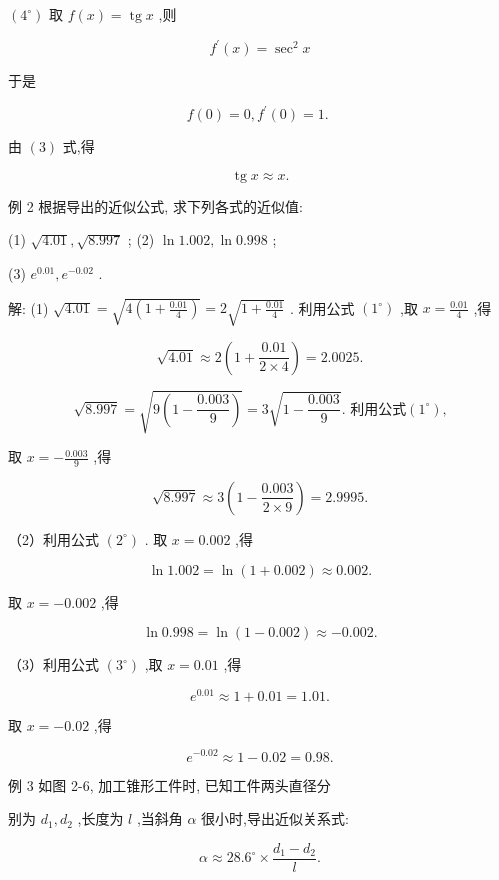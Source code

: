 \documentclass[lang=cn,newtx,10pt,scheme=chinese]{elegantbook}
\begin{document}
\(\left( {4}^{ \circ }\right)\) 取 \(f\left( x\right) = \operatorname{tg}x\) ,则

\[
{f}^{\prime }\left( x\right) = {\sec }^{2}x
\]

于是

\[
f\left( 0\right) = 0,{f}^{\prime }\left( 0\right) = 1\text{. }
\]

由 \(\left( 3\right)\) 式,得

\[
\operatorname{tg}x \approx x\text{.}
\]

例 2 根据导出的近似公式, 求下列各式的近似值:

(1) \(\sqrt{4.01},\sqrt{8.997}\) ; (2) \(\ln {1.002},\ln {0.998}\) ;

(3) \({e}^{0.01},{e}^{-{0.02}}\) .

解: (1) \(\sqrt{4.01} = \sqrt{4\left( {1 + \frac{0.01}{4}}\right) } = 2\sqrt{1 + \frac{0.01}{4}}\) . 利用公式 \(\left( {1}^{ \circ }\right)\) ,取 \(x = \frac{0.01}{4}\) ,得

\[
\sqrt{4.01} \approx 2\left( {1 + \frac{0.01}{2 \times 4}}\right) = {2.0025}.
\]

\[
\sqrt{8.997} = \sqrt{9\left( {1 - \frac{0.003}{9}}\right) } = 3\sqrt{1 - \frac{0.003}{9}}\text{. 利用公式}\left( {1}^{ \circ }\right) \text{,}
\]

取 \(x = - \frac{0.003}{9}\) ,得

\[
\sqrt{8.997} \approx 3\left( {1 - \frac{0.003}{2 \times 9}}\right) = {2.9995}.
\]

（2）利用公式 \(\left( {2}^{ \circ }\right)\) . 取 \(x = {0.002}\) ,得

\[
\ln {1.002} = \ln \left( {1 + {0.002}}\right) \approx {0.002}\text{.}
\]

取 \(x = - {0.002}\) ,得

\[
\ln {0.998} = \ln \left( {1 - {0.002}}\right) \approx - {0.002}.
\]

（3）利用公式 \(\left( {3}^{ \circ }\right)\) ,取 \(x = {0.01}\) ,得

\[
{e}^{0.01} \approx 1 + {0.01} = {1.01}.
\]

取 \(x = - {0.02}\) ,得

\[
{e}^{-{0.02}} \approx 1 - {0.02} = {0.98}.
\]

例 3 如图 2-6, 加工锥形工件时, 已知工件两头直径分

别为 \({d}_{1},{d}_{2}\) ,长度为 \(l\) ,当斜角 \(\alpha\) 很小时,导出近似关系式:

\[
\alpha \approx {28.6}^{ \circ } \times \frac{{d}_{1} - {d}_{2}}{l}.
\]
\end{document}
